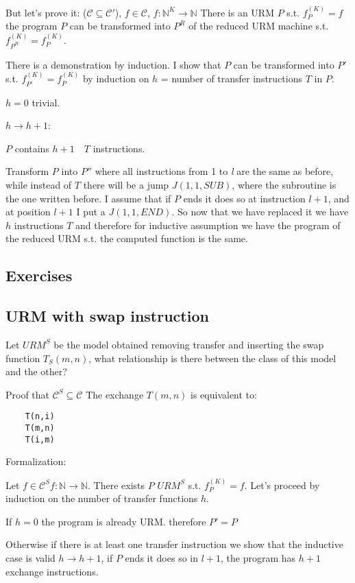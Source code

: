 \documentclass{amsbook}
\newcommand{\nat}{\ensuremath{\mathbb{N}}}
\theoremstyle{definition}
\theoremstyle{remark}
\numberwithin{section}{chapter}
\numberwithin{equation}{chapter}
\begin{document}
But let's prove it: ($ \mathcal{C} \subseteq \mathcal{C}' $), $ f \in \mathcal{C} $, $ f: \nat^K \rightarrow \nat $ There is an URM $P$ s.t. $ f_P^{(K)}  = f$ the program $P$ can be transformed into $P ^R $ of the reduced URM machine s.t. $ f_{P^R}^{(K)}  = f_{P}^{(K)}$.

There is a demonstration by induction. I show that $P$ can be transformed into $P' $ s.t. $ f_{P'}^{(K)}  = f_{P}^{(K)} $ by induction on $h$ = number of transfer instructions $T$ in $P$.

$h = 0$ trivial.

$h \rightarrow  h + 1$:

$P$ contains $h + 1 \quad T$ instructions.

Transform $P$ into $P''$ where all instructions from 1 to \textit{l} are the same as before, while instead of $T$ there will be a jump $J(1,1, SUB)$, where the subroutine is the one written before. I assume that if $P$ ends it does so at instruction $l + 1$, and at position $l + 1$ I put a $J (1,1, END)$. So now that we have replaced it we have $h$ instructions $T$ and therefore for inductive assumption we have the program of the reduced URM s.t. the computed function is the same.

\subsection{Exercises}

\subsection{URM with swap instruction}
Let $URM^S $ be the model obtained removing transfer and inserting the swap function $ T_S(m,n) $, what relationship is there between the class of this model and the other?

Proof that $ \mathcal{C}^S \subseteq \mathcal{C} $ The exchange $T (m, n)$ is equivalent to:

\begin{lstlisting}
	T(n,i)
	T(m,n)
	T(i,m)
	\end{lstlisting}

Formalization:

Let $ f \in \mathcal{C}^S f:\nat\rightarrow \nat $. There exists $P$  $URM^S $ s.t. $ f_P^{(K)} = f $. Let's proceed by induction on the number of transfer functions $h$.

If $h = 0$ the program is already URM. therefore $ P' = P $

Otherwise if there is at least one transfer instruction we show that the inductive case is valid $ h \rightarrow h+1 $, if $P$ ends it does so in $l + 1$, the program has $h + 1$ exchange instructions.
\end{document}
